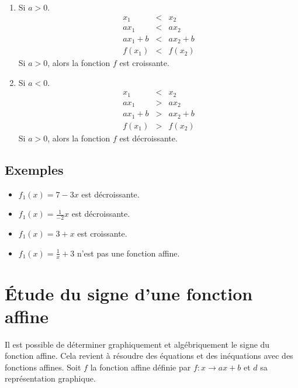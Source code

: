 \documentclass[paper=a4, fontsize=9pt]{scrartcl} %
\begin{document}
\begin{multicols}{2}
  \begin{enumerate}
  \item Si $a > 0$.\\
    \begin{eqnarray*}
      x_1 &<& x_2\\
      a x_1 &<& a x_2\\
      a x_1 + b &<& a x_2 + b\\
      f(x_1) &<& f(x_2)
    \end{eqnarray*}
    Si $a>0$, alors la fonction $f$ est croissante.
  \item Si $a < 0$.\\
    \begin{eqnarray*}
      x_1 &<& x_2\\
      a x_1 &>& a x_2\\
      a x_1 + b &>& a x_2 + b\\
      f(x_1) &>& f(x_2)
    \end{eqnarray*}
    Si $a>0$, alors la fonction $f$ est décroissante.
  \end{enumerate}
\end{multicols}

\subsection{Exemples}

\begin{itemize}
\item $f_1(x) = 7 - 3x$ est décroissante.
\item $f_1(x) = \frac{1}{-2} x$ est décroissante.
\item $f_1(x) = 3 + x$ est croissante.
\item $f_1(x) = \frac{1}{x} + 3$ n'est pas une fonction affine.
\end{itemize}

\newpage

\section{Étude du signe d'une fonction affine}

Il est possible de déterminer graphiquement et algébriquement le signe du fonction affine. Cela revient à résoudre des équations et des inéquations avec des fonctions affines. Soit $f$ la fonction affine définie par $f : x \to ax + b$ et $d$ sa représentation graphique.
\end{document}
